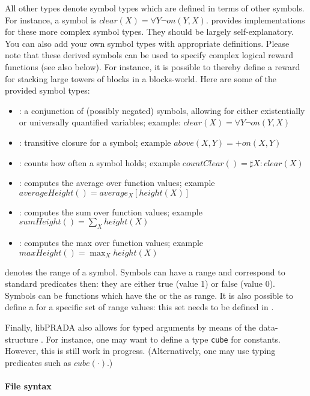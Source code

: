 \documentclass[10pt,twoside,twocolumn,fleqn]{article}
\begin{document}
All other types denote symbol types which are defined in terms of other
symbols. For instance, a  symbol is $clear(X) = \forall Y
\neg on(Y,X)$.  provides implementations for these more
complex symbol types. They should be largely self-explanatory. You can also
add your own symbol types with appropriate definitions. Please note that
these derived symbols can be used to specify complex logical reward
functions (see also below). For instance, it is possible to thereby define
a reward for stacking large towers of blocks in a blocks-world. Here are
some of the provided symbol types:
\begin{itemize}
\item {}: a conjunction of (possibly negated)
symbols, allowing for either existentially or universally quantified
variables;
example: $clear(X) = \forall Y \neg on(Y,X)$
\item {}: transitive closure for a symbol;
example
$above(X,Y) = +on(X,Y)$
\item {}: counts how often a symbol holds; example
$countClear() = \sharp X: clear(X)$
\item {}: computes the average over function values;
example $averageHeight() = average_X[height(X)]$
\item {}: computes the sum over function values;
example $sumHeight() = \sum_X height(X)$
\item {}: computes the max over function values;
example $maxHeight() = \max_X height(X)$
\end{itemize}


 denotes the range of a symbol. Symbols can have a
 range and correspond to standard predicates then: they are
either true (value 1) or false (value 0). Symbols can be functions which
have the  or the  as range. It is also
possible to define a  for a specific set of range
values: this set needs to be defined in .

Finally, libPRADA also allows for typed arguments by means of the
data-structure . For instance, one may want to define a
type \texttt{cube} for constants. However, this is still work in progress.
(Alternatively, one may use typing predicates such as $cube(\cdot)$.)



\paragraph{File syntax}
\end{document}
